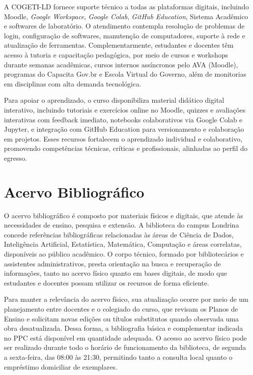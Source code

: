 A COGETI-LD fornece suporte técnico a todas as plataformas digitais, incluindo Moodle, \textit{Google Workspace}, \textit{Google Colab}, \textit{GitHub Education}, Sistema Acadêmico e softwares de laboratório. O atendimento contempla resolução de problemas de login, configuração de softwares, manutenção de computadores, suporte à rede e atualização de ferramentas. Complementarmente, estudantes e docentes têm acesso à tutoria e capacitação pedagógica, por meio de cursos e workshops durante semanas acadêmicas, cursos internos assíncronos pelo AVA (Moodle), programas do Capacita Gov.br e Escola Virtual do Governo, além de monitorias em disciplinas com alta demanda tecnológica.

Para apoiar o aprendizado, o curso disponibiliza material didático digital interativo, incluindo tutoriais e exercícios online no Moodle, quizzes e avaliações interativas com feedback imediato, notebooks colaborativos via Google Colab e Jupyter, e integração com GitHub Education para versionamento e colaboração em projetos. Esses recursos fortalecem o aprendizado individual e colaborativo, promovendo competências técnicas, críticas e profissionais, alinhadas ao perfil do egresso.

\section{Acervo Bibliográfico}

O acervo bibliográfico é composto por materiais físicos e digitais, que atende às necessidades de ensino, pesquisa e extensão. A biblioteca do campus Londrina concede referências bibliográficas relacionadas às áreas de Ciência de Dados, Inteligência Artificial, Estatística, Matemática, Computação e áreas correlatas, disponíveis ao público acadêmico. O corpo técnico, formado por bibliotecários e assistentes administrativos, presta orientação na busca e recuperação de informações, tanto no acervo físico quanto em bases digitais, de modo que estudantes e docentes possam utilizar os recursos de forma eficiente.

Para manter a relevância do acervo físico, sua atualização ocorre por meio de um planejamento entre docentes e o colegiado do curso, que revisam os Planos de Ensino e solicitam novas edições ou títulos substitutos quando observada uma obra desatualizada. Dessa forma, a bibliografia básica e complementar indicada no PPC está disponível em quantidade adequada. O acesso ao acervo físico pode ser realizado durante todo o horário de funcionamento da biblioteca, de segunda a sexta-feira, das 08:00 às 21:30, permitindo tanto a consulta local quanto o empréstimo domiciliar de exemplares.

